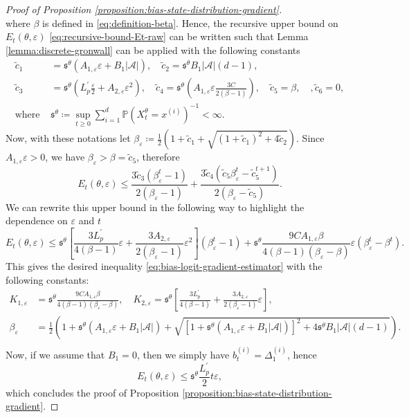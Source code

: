 \documentclass[11pt]{article}
\numberwithin{equation}{section}
\theoremstyle{definition}
\theoremstyle{remark}
\def\eps{\varepsilon}
\def\cA{\mathcal{A}}
\begin{document}
\begin{proof}[Proof of Proposition \ref{proposition:bias-state-distribution-gradient}]
\[\]
where $\beta$ is defined in \eqref{eq:definition-beta}.
Hence, the recursive upper bound on $E_t(\theta, \eps)$ \eqref{eq:recursive-bound-Et-raw} can be written such that Lemma \ref{lemma:discrete-gronwall} can be applied with the following constants
\[
\begin{aligned}
    \tilde c_1 &=  \mathfrak s^\theta \left( A_{1, \eps} \eps + B_1 | \cA | \right), \quad 
    \tilde c_2 =  \mathfrak s^\theta B_1 | \cA | (d - 1), \\
    \tilde c_3 &= \mathfrak s^\theta \left(L^\prime_p \frac{\eps}{2} + A_{2, \eps} \eps^2 \right), \quad \tilde c_4 = \mathfrak s^\theta \left( A_{1, \eps} \eps \frac{3C}{2 (\beta - 1)} \right), \quad 
    \tilde c_5 = \beta, \quad, \tilde c_6 = 0, \\
    \text{where }& \mathfrak s^\theta \coloneq \sup_{t \geq 0} \sum_{i=1}^d \mathbb P (X_t^\theta = x^{(i)})^{-1} < \infty.
\end{aligned}
\]
Now, with these notations let $\beta_\eps \coloneq \frac{1}{2} ( 1 + \tilde c_1 + \sqrt{(1 + \tilde c_1)^2 + 4 \tilde c_2})$.
Since $ A_{1, \eps} \eps > 0$, we have $\beta_\eps > \beta = \tilde c_5$,
therefore
\[
E_t(\theta, \eps) \leq \frac{3 \tilde c_3 (\beta_\eps ^t - 1)}{2 (\beta_\eps - 1)} + \frac{3 \tilde c_4 (\tilde c_5 \beta_\eps^t - \tilde c_5^{t+1})}{2 (\beta_\eps - \tilde c_5)}.
\]
We can rewrite this upper bound in the following way to highlight the dependence on $\eps$ and $t$
\[
E_t (\theta, \eps) \leq \mathfrak s^\theta \left[ \frac{3 L_p^\prime}{4 (\beta - 1)}\eps + \frac{3 A_{2, \eps}}{2(\beta_\eps - 1)}\eps^2 \right] \left(\beta_\eps^t - 1\right) + \mathfrak s^\theta \frac{9 C A_{1, \eps} \beta}{4(\beta - 1)(\beta_\eps - \beta)}\eps \left(\beta_\eps^t - \beta^t \right).
\]
This gives the desired inequality \eqref{eq:bias-logit-gradient-estimator} with the following constants:
\begin{equation}
    \label{eq:constants-bias-logits}
    \begin{aligned}
    K_{1, \eps} &= \mathfrak s^\theta \frac{9 C A_{1, \eps} \beta}{4(\beta - 1)(\beta_\eps - \beta)}, \quad
    K_{2, \eps} = \mathfrak s^\theta \left[ \frac{3 L_p^\prime}{4 (\beta - 1)} + \frac{3 A_{2, \eps}}{2(\beta_\eps - 1)}\eps \right], \\
    \beta_\eps &= \frac{1}{2} \left(
            1 + \mathfrak s^\theta \left(  A_{1, \eps} \eps + B_1 |\mathcal A| \right) + \sqrt{
            \left[ 1 + \mathfrak s^\theta \left( A_{1, \eps} \eps + B_1 |\mathcal A| \right) \right]^2
            + 4 \mathfrak s^\theta B_1 |\mathcal A| (d - 1)}\right). \\
    \end{aligned}
\end{equation}
Now, if we assume that $ B_1 = 0$, then we simply have  
$b_t^{(i)} = \Delta_1^{(i)}$, hence 
\[
E_t(\theta, \eps) \leq \mathfrak s^\theta \frac{L^\prime_p}{2} t \eps, 
\]
which concludes the proof of Proposition \ref{proposition:bias-state-distribution-gradient}.
\end{proof}
\end{document}
